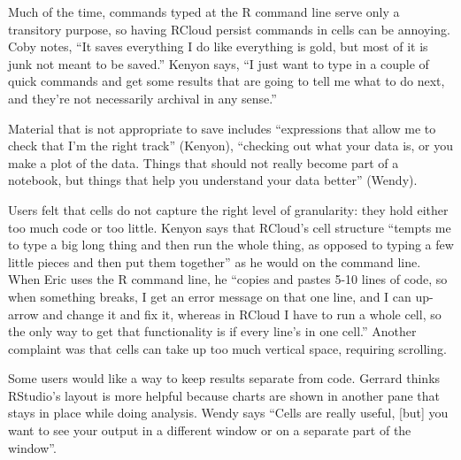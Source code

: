 
Much of the time, commands typed at the R command line serve only a transitory
purpose, so having RCloud persist commands in cells can be annoying.
Coby notes, ``It saves everything I do like everything is gold, but most
of it is junk not meant to be saved.'' Kenyon says, ``I just want to type in a
couple of quick commands and get some results that are going to tell
me what to do next, and they're not necessarily archival in any sense.''

Material that is not appropriate to save includes ``expressions that allow
me to check that I'm the right track'' (Kenyon), ``checking out what your data is,
or you make a plot of the data. Things that should not really become part of a
notebook, but things that help you understand your data better'' (Wendy).

Users felt that cells do not capture the right level of granularity: they
hold either too much code or too little. Kenyon says that RCloud's cell structure
``tempts me to type a big long thing and then run the whole thing, as opposed to
typing a few little pieces and then put them together'' as he would on the command line.
When Eric uses the R command line, he ``copies and pastes 5-10 lines of code,
so when something breaks, I get an error message on that one line, and I can
up-arrow and change it and fix it, whereas in RCloud I have to run a whole cell,
so the only way to get that functionality is if every line's in one cell.''
Another complaint was that cells can take up too much vertical space, requiring scrolling.

Some users would like a way to keep results separate from code.
Gerrard thinks RStudio's layout is more helpful because charts
are shown in another pane that stays in place while doing analysis. Wendy says
``Cells are really useful, [but] you want to see your output in a different
window or on a separate part of the window''.

